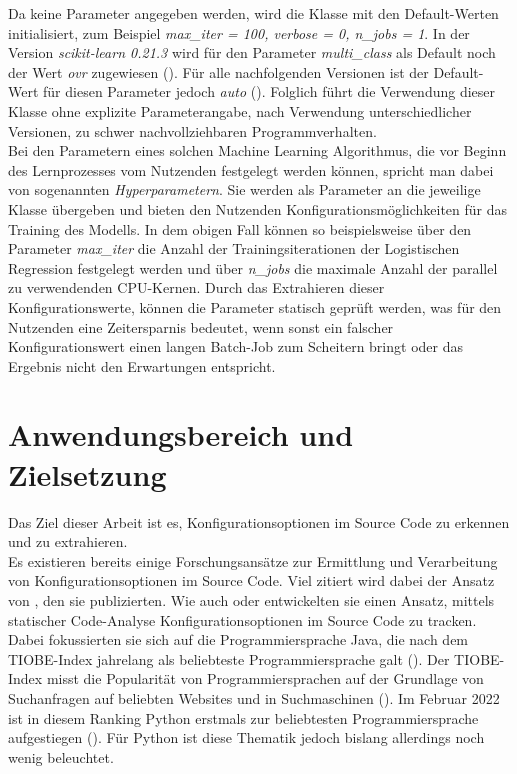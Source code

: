 \documentclass[german,bachelor]{swsLeipzig}
\begin{document}
Da keine Parameter angegeben werden, wird die Klasse mit den Default-Werten initialisiert, zum Beispiel
\textit{max\_iter = 100, verbose = 0, n\_jobs = 1}.
In der Version \textit{scikit-learn 0.21.3} wird für den Parameter \textit{multi\_class} als Default noch der Wert \textit{ovr} zugewiesen (\citeyear{sklearn}).
Für alle nachfolgenden Versionen ist der Default-Wert für diesen Parameter jedoch \textit{auto} (\citeyear{sklearn}).
Folglich führt die Verwendung dieser Klasse ohne explizite Parameterangabe, nach Verwendung unterschiedlicher Versionen, zu schwer nachvollziehbaren Programmverhalten.\\

Bei den Parametern eines solchen Machine Learning Algorithmus, die vor Beginn des Lernprozesses vom Nutzenden festgelegt werden können,
spricht man dabei von sogenannten \textit{Hyperparametern}.
Sie werden als Parameter an die jeweilige Klasse übergeben und bieten den Nutzenden Konfigurationsmöglichkeiten für
das Training des Modells.
In dem obigen Fall können so beispielsweise über den Parameter \textit{max\_iter} die Anzahl der Trainingsiterationen
der Logistischen Regression festgelegt werden und über \textit{n\_jobs} die maximale Anzahl der parallel zu verwendenden CPU-Kernen.
Durch das Extrahieren dieser Konfigurationswerte, können die Parameter statisch geprüft werden, was für den Nutzenden
eine Zeitersparnis bedeutet, wenn sonst ein falscher Konfigurationswert einen langen Batch-Job zum Scheitern bringt
oder das Ergebnis nicht den Erwartungen entspricht. \\



\section{Anwendungsbereich und Zielsetzung}
Das Ziel dieser Arbeit ist es, Konfigurationsoptionen im Source Code zu erkennen und zu extrahieren. \\

Es existieren bereits einige Forschungsansätze zur Ermittlung und Verarbeitung von Konfigurationsoptionen im Source Code.
Viel zitiert wird dabei der Ansatz von \citeauthor{10.1145/1985793.1985812}, den sie \citeyear{10.1145/1985793.1985812} publizierten.
Wie auch \citeauthor{7774519} oder \citeauthor{8049300} entwickelten sie einen Ansatz, mittels statischer Code-Analyse Konfigurationsoptionen
im Source Code zu tracken.
Dabei fokussierten sie sich auf die Programmiersprache Java, die nach dem TIOBE-Index jahrelang als beliebteste Programmiersprache galt (\citeyear{enwiki:1077809155}).
Der TIOBE-Index misst die Popularität von Programmiersprachen auf der Grundlage von Suchanfragen auf beliebten Websites und in Suchmaschinen (\citeyear{enwiki:1077809155}).
Im Februar 2022 ist in diesem Ranking Python erstmals zur beliebtesten Programmiersprache aufgestiegen (\citeyear{enwiki:1077809155}).
Für Python ist diese Thematik jedoch bislang allerdings noch wenig beleuchtet. \\
\end{document}
